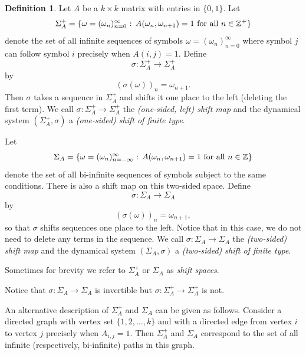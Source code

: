 \documentclass[12pt]{article}
\theoremstyle{definition}
\newtheorem{definition}[theorem]{Definition}
\theoremstyle{remark}
\begin{document}
\begin{definition}
Let $A$ be a $k \times k$ matrix with entries in $\{0,1\}$.   Let
\[
 \Sigma_{A}^{+} = \{ \omega =(\omega_{n})_{n=0}^{\infty} \hbox{ : } A(\omega_{n},\omega_{n+1}) =
 1\ \mbox{for all}\ n \in \mathbb Z^+ 
 \}
\]
denote the set of all infinite sequences of symbols $\omega=(\omega_{n})_{n=0}^\infty$ where
symbol $j$ can follow symbol $i$ precisely when $A(i,j)=1$.  
Define
\[
 \sigma  :  \Sigma_{A}^{+} \rightarrow \Sigma_{A}^{+} 
\]
by
\[ 
 (\sigma(\omega))_{n} = \omega_{n+1}.
\]
Then $\sigma$ takes a sequence in $\Sigma_{A}^{+}$ and shifts it one
place to the left (deleting the first term).  We call $\sigma : \Sigma_A^+ \to \Sigma_A^+$ the
{\it  (one-sided, left) shift map} and
the dynamical system
$(\Sigma_{A}^{+},\sigma)$ a {\it  (one-sided) shift of finite type}.

Let 
\[
 \Sigma_{A} = \{\omega= (\omega_{n})_{n=-\infty}^{\infty} \hbox{ : } A(\omega_{n},\omega_{n+1}) =
 1\ \mbox{for all}\ n \in \mathbb Z \}
\]
denote the set of all bi-infinite sequences of symbols subject to the
same conditions.  There is also a shift map on this two-sided space.
Define
\[
 \sigma : \Sigma_{A} \rightarrow \Sigma_{A}
\]
by
\[
 (\sigma(\omega))_{n} = \omega_{n+1},
\]
so that $\sigma$ shifts sequences one place to the left.  Notice that
in this case, we do not need to delete any terms in the sequence.  We
call $\sigma : \Sigma_A \to \Sigma_A$ the {\it  (two-sided) shift map}
and
the dynamical system
$(\Sigma_{A},\sigma)$ a {\it  (two-sided) shift of finite type}.

Sometimes for brevity we refer to $\Sigma_{A}^{+}$ or $\Sigma_{A}$ as
{\it  shift spaces}.
\end{definition}

Notice that $\sigma : \Sigma_A \to \Sigma_A$ is invertible but 
$\sigma : \Sigma_A^+ \to \Sigma_A^+$ is not.  

\medskip


An alternative description of $\Sigma_{A}^{+}$ and $\Sigma_{A}$ can be
given as follows.  Consider a directed graph with vertex set $\{ 1,2, \ldots,
k\}$ and with a directed edge from vertex $i$ to vertex $j$ precisely
when $A_{i,j}=1$.  Then $\Sigma_{A}^{+}$ and $\Sigma_{A}$ correspond
to the set of all infinite (respectively, bi-infinite) paths in this
graph.






\end{document}
